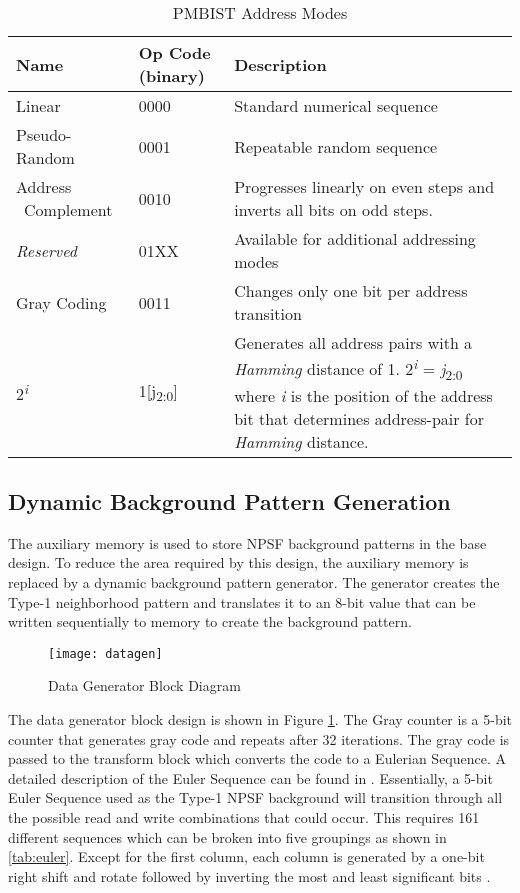\begin{table}[H]
  \caption{PMBIST Address Modes}
  \centering
 \begin{tabular}{|p{1in}|p{0.75in}|p{3in}|}
  \hline
  Name & Op Code (binary) & Description \\ [0.5ex]
  \hline\hline
  Linear              & 0000 & Standard numerical sequence  \\ 
  \hline
  Pseudo-Random       & 0001 & Repeatable random sequence \\ 
  \hline
  Address \ Complement  & 0010 & Progresses linearly on even steps and inverts all bits on odd steps.\\ 
  \hline
  \textit{Reserved}            & 01XX & Available for additional addressing modes \\ 
  \hline
  Gray Coding         & 0011 & Changes only one bit per address transition \\ 
  \hline
  2\textsuperscript{\textit{i}}& 1[j\textsubscript{2:0}] & Generates all address pairs with a \textit{Hamming} distance of 1.  2\textsuperscript{\textit{i}} = \textit{j}\textsubscript{2:0} where \textit{i} is the position of the address bit that determines address-pair for \textit{Hamming} distance. \\ 
  \hline
 \end{tabular}
\label{tab:addrmode}
\end{table}

\subsection{Dynamic Background Pattern Generation}
\label{sec:dg}
The auxiliary memory is used to store NPSF background patterns in the base design.  To reduce the area required by this design, the auxiliary memory is replaced by a dynamic background pattern generator.  The generator creates the Type-1 neighborhood pattern and translates it to an 8-bit value that can be written sequentially to memory to create the background pattern.

\begin{figure}[H]
  \centering
  \texttt{[image: datagen]}
  \caption{Data Generator Block Diagram}
  \label{fig:datagen}
\end{figure}
The data generator block design is shown in Figure \ref{fig:datagen}.  The Gray counter is a 5-bit counter that generates gray code and repeats after 32 iterations.  The gray code is passed to the transform block which converts the code to a Eulerian Sequence.  A detailed description of the Euler Sequence can be found in \cite{1675556}.  Essentially, a 5-bit Euler Sequence used as the Type-1 NPSF background will transition through all the possible read and write combinations that could occur.  This requires 161 different sequences which can be broken into five groupings as shown in \ref{tab:euler}.  Except for the first column, each column is generated by a one-bit right shift and rotate followed by inverting the most and least significant bits \cite{00957583}.

